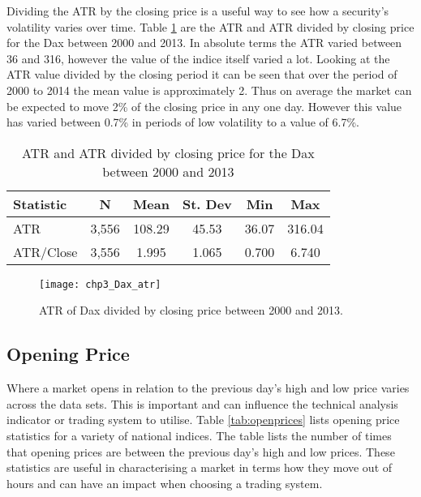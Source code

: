 Dividing the ATR by the closing price is a useful way to see how a security's volatility varies over time. Table \ref{tab:atr_dax} are the ATR and ATR divided by closing price for the Dax between 2000 and 2013. In absolute terms the ATR varied between 36 and 316, however the value of the indice itself varied a lot. Looking at the ATR value divided by the closing period it can be seen that over the period of 2000 to 2014 the mean value is approximately 2. Thus on average the market can be expected to move 2\% of the closing price in any one day. However this value has varied between 0.7\% in periods of low volatility to a value of 6.7\%.

\begin{table}[!htbp] \centering 
  \caption[Average True Range of Dax]{ATR and ATR divided by closing price for the Dax between 2000 and 2013} 
  \label{tab:atr_dax} 
\begin{tabular}{lccccc} 
\toprule
Statistic & N & Mean & St. Dev & Min & Max \\ 
\midrule
ATR & 3,556 & 108.29 & 45.53 & 36.07 & 316.04 \\ 
ATR/Close & 3,556 & 1.995 & 1.065 & 0.700 & 6.740 \\ 
\bottomrule
\end{tabular} 
\end{table} 

\begin{figure}[tbph]
\centering
\texttt{[image: chp3\_Dax\_atr]}
\caption[ATR of Dax Divided by Closing Price]{ATR of Dax divided by closing price between 2000 and 2013.}
\label{fig:Dax_atr}
\end{figure}

\subsection{Opening Price}
Where a market opens in relation to the previous day's high and low price varies across the data sets. This is important and can influence the technical analysis indicator or trading system to utilise. Table \ref{tab:openprices} lists opening price statistics for a variety of national indices. The table lists the number of times that opening prices are between the previous day's high and low prices. These statistics are useful in characterising a market in terms how they move out of hours and can have an impact when choosing a trading system.


